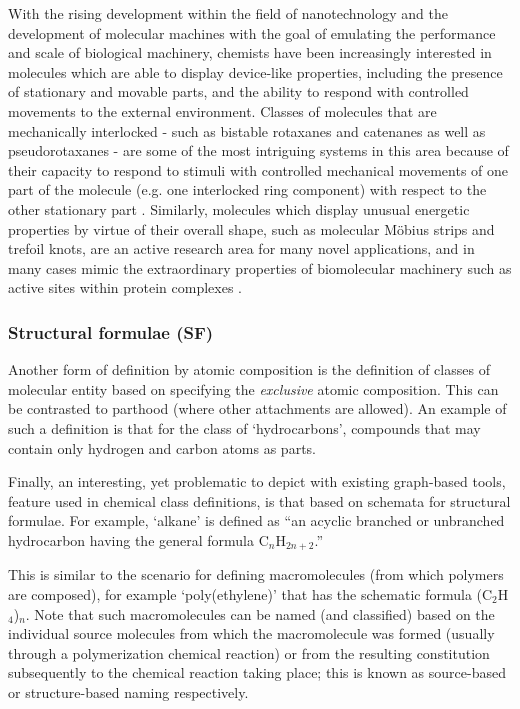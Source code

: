 \documentclass[10pt]{bmc_article}
\newenvironment{bmcformat}{\baselineskip20pt\sloppy\setboolean{publ}{false}}{\baselineskip20pt\sloppy}
\begin{document}
\begin{bmcformat}
With the rising development within the field of nanotechnology and the development of molecular machines with the goal of emulating the performance and scale of biological machinery, chemists have been increasingly interested in molecules which are able to display device-like properties, including the presence of stationary and movable parts, and the ability to respond with controlled movements to the external environment. Classes of molecules that are mechanically interlocked  - such as bistable rotaxanes and catenanes as well as pseudorotaxanes - are some of the most intriguing systems in this area because of their capacity to respond to stimuli with controlled mechanical movements of one part of the molecule (e.g. one interlocked ring component) with respect to the other stationary part \cite{stoddart2011}.  Similarly, molecules which display unusual energetic properties by virtue of their overall shape, such as molecular M\"{o}bius strips and trefoil knots, are an active research area for many novel applications, and in many cases mimic the extraordinary properties of biomolecular machinery such as active sites within protein complexes \cite{rzepa2009a,rzepa2009b}.  



\subsubsection*{Structural formulae (SF)}
\label{sec:molformula}

Another form of definition by atomic composition is the definition of classes of molecular entity based on specifying the \textit{exclusive} atomic composition.  This can be contrasted to parthood (where other attachments are allowed).  An example of such a definition is that for the class of `hydrocarbons', compounds that may contain only hydrogen and carbon atoms as parts. 

Finally, an interesting, yet problematic to depict with existing graph-based tools, feature used in chemical class definitions, is that based on schemata for structural formulae.  For example, `alkane' is defined as ``an acyclic branched or unbranched hydrocarbon having the general formula C$_{n}$H$_{2n+2}$.'' 

This is similar to the scenario for defining macromolecules (from which polymers are composed), for example `poly(ethylene)' that has the schematic formula (C$_2$H$_4$)$_{n}$. Note that such macromolecules can be named (and classified) based on the individual source molecules from which the macromolecule was formed (usually through a polymerization chemical reaction) or from the resulting constitution subsequently to the chemical reaction taking place; this is known as source-based or structure-based naming respectively.  %


\end{bmcformat}
\end{document}
